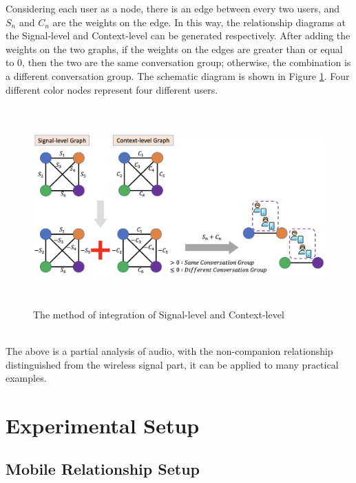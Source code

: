 \documentclass[a4paper,12pt]{report}
\begin{document}
Considering each user as a node, there is an edge between every two users, and $S_n$ and $C_n$ are the weights on the edge. In this way, the relationship diagrams at the Signal-level and Context-level can be generated respectively. After adding the weights on the two graphs, if the weights on the edges are greater than or equal to 0, then the two are the same conversation group; otherwise, the combination is a different conversation group. The schematic diagram is shown in Figure \ref{f:System_Design_Integration_SandC}. Four different color nodes represent four different users.
\\
\begin{figure}[btph]
\begin{center}
\includegraphics[width=6.3in,height=3in]{images and data/System_Integration_SandC_Yun.png}
\caption{The method of integration of Signal-level and Context-level}
\label{f:System_Design_Integration_SandC}
\end{center}
\end{figure}
\\
The above is a partial analysis of audio, with the non-companion relationship distinguished from the wireless signal part, it can be applied to many practical examples.

\chapter{Experimental Setup}
\section{Mobile Relationship Setup}
\end{document}
